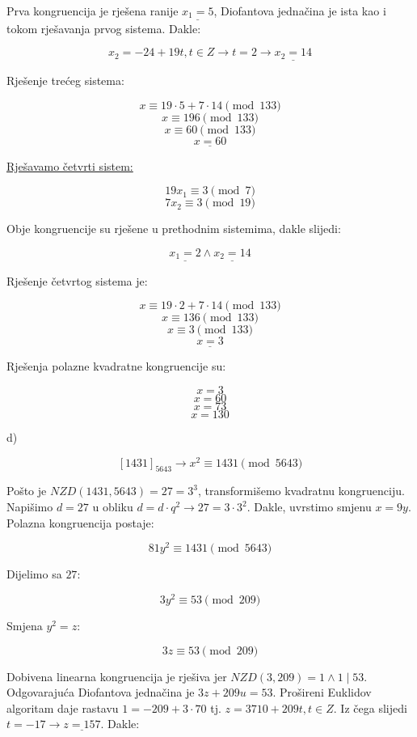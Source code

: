 \documentclass[12pt]{article}
\begin{document}
Prva kongruencija je rješena ranije $\underline{x_{1} = 5}$, Diofantova jednačina je ista kao i tokom rješavanja prvog sistema. Dakle:

$$x_{2} = -24 + 19t, t \in Z \to t = 2 \to \underline{x_{2} = 14}$$\vspace{1mm}

Rješenje trećeg sistema:

$$x \equiv 19 \cdot 5 + 7 \cdot 14 \pmod{133}$$
$$x \equiv 196 \pmod{133}$$
$$x \equiv 60 \pmod{133}$$
$$\underline{x = 60}$$\vspace{1mm}

\underline{Rješavamo četvrti sistem:}

$$19x_{1} \equiv 3 \pmod{7}$$
$$7x_{2} \equiv 3 \pmod{19}$$\vspace{1mm}

Obje kongruencije su rješene u prethodnim sistemima, dakle slijedi:

$$\underline{x_{1} = 2} \land \underline{x_{2} = 14}$$\vspace{1mm}

Rješenje četvrtog sistema je:

$$x \equiv 19 \cdot 2 + 7 \cdot 14 \pmod{133}$$
$$x \equiv 136 \pmod{133}$$
$$x \equiv 3 \pmod{133}$$
$$\underline{x = 3}$$\vspace{1mm}

Rješenja polazne kvadratne kongruencije su:

$$x = 3$$
$$x = 60$$
$$x = 73$$
$$x = 130$$

d)

$$[1431]_{5643} \to x^2\equiv 1431 \pmod{5643}$$\vspace{1mm}

Pošto je $NZD(1431, 5643) = 27 = 3^3$, transformišemo kvadratnu kongruenciju. Napišimo $d = 27$ u obliku $d = d \cdot q^2 \to 27 = 3 \cdot 3^2$. Dakle, uvrstimo smjenu $x = 9y$. Polazna kongruencija postaje:

$$81y^2 \equiv 1431 \pmod{5643}$$\vspace{1mm}

Dijelimo sa $27$:

$$3y^2 \equiv 53 \pmod{209}$$\vspace{1mm}

Smjena $y^2 = z$:

$$3z \equiv 53 \pmod{209}$$\vspace{1mm}

Dobivena linearna kongruencija je rješiva jer $NZD(3, 209) = 1 \land 1 \mid 53$. Odgovarajuća Diofantova jednačina je $3z + 209u = 53$. Prošireni Euklidov algoritam daje rastavu $1 = -209 + 3 \cdot 70$ tj. $z = 3710 + 209t, t \in Z$. Iz čega slijedi $t = -17 \to \underline{z = 157}$. Dakle:
\end{document}
